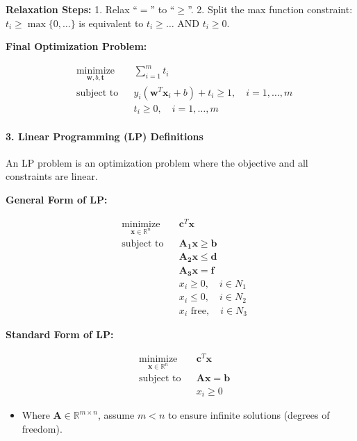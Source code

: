 \documentclass[11pt,a4paper]{article}
\providecommand{\tightlist}{\setlength{\itemsep}{0pt}\setlength{\parskip}{0pt}}
\begin{document}
\textbf{Relaxation Steps:} 1. Relax ``\(=\)'' to ``\(\geq\)''. 2. Split the max function constraint: \(t_i \geq \max\{0, \dots\}\) is equivalent to \(t_i \geq \dots\) AND \(t_i \geq 0\).

\textbf{Final Optimization Problem:}

\[
\begin{aligned}
& \underset{\boldsymbol{w}, b, \boldsymbol{t}}{\text{minimize}} & & \sum_{i=1}^m t_i \\
& \text{subject to} & & y_i (\boldsymbol{w}^T \boldsymbol{x}_i + b) + t_i \geq 1, \quad i = 1, \dots, m \\
& & & t_i \geq 0, \quad i = 1, \dots, m
\end{aligned}
\]

\paragraph{3. Linear Programming (LP) Definitions}\label{linear-programming-lp-definitions}

An LP problem is an optimization problem where the objective and all constraints are linear.

\textbf{General Form of LP:}

\[
\begin{aligned}
& \underset{\boldsymbol{x} \in \mathbb{R}^n}{\text{minimize}} & & \boldsymbol{c}^T \boldsymbol{x} \\
& \text{subject to} & & \boldsymbol{A_1 x} \geq \boldsymbol{b} \\
& & & \boldsymbol{A_2 x} \leq \boldsymbol{d} \\
& & & \boldsymbol{A_3 x} = \boldsymbol{f} \\
& & & x_i \geq 0, \quad i \in N_1 \\
& & & x_i \leq 0, \quad i \in N_2 \\
& & & x_i \text{ free}, \quad i \in N_3
\end{aligned}
\]

\textbf{Standard Form of LP:}

\[
\begin{aligned}
& \underset{\boldsymbol{x} \in \mathbb{R}^n}{\text{minimize}} & & \boldsymbol{c}^T \boldsymbol{x} \\
& \text{subject to} & & \boldsymbol{A x} = \boldsymbol{b} \\
& & & x_i \geq 0
\end{aligned}
\]

\begin{itemize}
\tightlist
\item
  Where \(\boldsymbol{A} \in \mathbb{R}^{m \times n}\), assume \(m < n\) to ensure infinite solutions (degrees of freedom).
\end{itemize}
\end{document}
